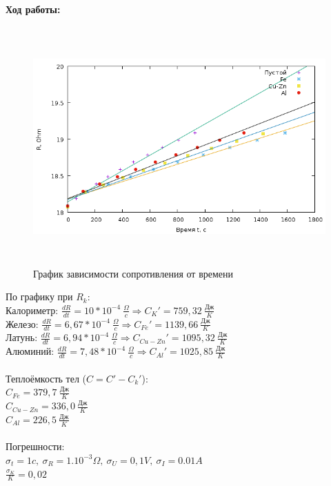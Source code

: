 \documentclass[a4paper]{article}
\begin{document}
	\paragraph{Ход работы:}
	\begin{figure}[ht!]
		\centering
		\includegraphics[height=90mm]{pic3.png}
		\caption{График зависимости сопротивления от времени}
	\end{figure}
	По графику при $R_k$:\\
	Калориметр: $\frac{dR}{dt}=10*10^{-4} \ \frac{\Omega}{c} \Rightarrow C_K' = 759,32\  \frac{\text{Дж}}{K}$ \\
	Железо: $\frac{dR}{dt}=6,67*10^{-4} \ \frac{\Omega}{c} \Rightarrow C_{Fe}' = 1139,66\  \frac{\text{Дж}}{K}$ \\
	Латунь: $\frac{dR}{dt}=6,94*10^{-4} \ \frac{\Omega}{c} \Rightarrow C_{Cu-Zn} ' = 1095,32\  \frac{\text{Дж}}{K}$ \\
	Алюминий: $\frac{dR}{dt}=7,48*10^{-4} \ \frac{\Omega}{c} \Rightarrow C_{Al}' = 1025,85\  \frac{\text{Дж}}{K}$ \\\\
	Теплоёмкость тел ($C=C'-C_k'$):\\
	$C_{Fe} = 379,7 \  \frac{\text{Дж}}{K}$ \\
	$C_{Cu-Zn} = 336,0 \  \frac{\text{Дж}}{K}$ \\
	$C_{Al} = 226,5 \  \frac{\text{Дж}}{K}$ \\
	\\Погрешности:\\
	$\sigma _t = 1 c,\  \sigma _R = 1.10^{-3} \Omega,\ \sigma _U = 0,1 V,\  \sigma _I = 0.01 A$ \\
	$\frac{\sigma _K}{K} = 0,02$\\
\end{document}
